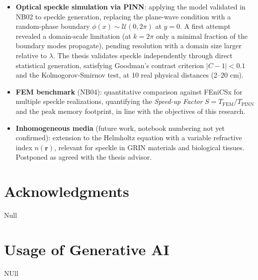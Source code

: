 \begin{itemize}
  \item \textbf{Optical speckle simulation via PINN}: applying the model validated in
    NB02 to speckle generation, replacing the plane-wave condition with a
    random-phase boundary $\phi(x) \sim \mathcal{U}(0, 2\pi)$ at $y = 0$. A first
    attempt revealed a domain-scale limitation (at $k=2\pi$ only a minimal fraction
    of the boundary modes propagate), pending resolution with a domain size larger
    relative to $\lambda$. The thesis validates speckle independently through direct
    statistical generation, satisfying Goodman's contrast criterion $|C - 1| < 0.1$
    and the Kolmogorov-Smirnov test, at 10 real physical distances (2--20 cm).

  \item \textbf{FEM benchmark} (NB04): quantitative comparison against FEniCSx for
    multiple speckle realizations, quantifying the \textit{Speed-up Factor}
    $S = T_{\mathrm{FEM}} / T_{\mathrm{PINN}}$ \cite{Thuerey2021_PBDL} and the peak
    memory footprint, in line with the objectives of this research.

  \item \textbf{Inhomogeneous media} (future work, notebook numbering not yet
    confirmed): extension to the Helmholtz equation with a variable refractive index
    $n(\mathbf{r})$, relevant for speckle in GRIN materials and biological tissues.
    Postponed as agreed with the thesis advisor.
\end{itemize}

\section*{Acknowledgments}

Null

\section*{Usage of Generative AI}

NUll
